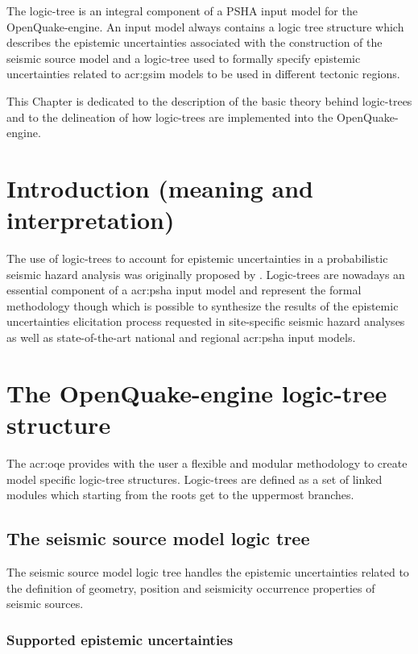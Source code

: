 %
The logic-tree is an integral component of a PSHA input model for the 
OpenQuake-engine. An input model always contains a logic tree structure 
which describes the epistemic uncertainties associated with the construction 
of the seismic source model and a logic-tree used to formally specify 
epistemic uncertainties related to \gls{acr:gsim} models to be used in 
different tectonic regions.

This Chapter is dedicated to the description of the basic theory behind 
logic-trees and to the delineation of how logic-trees are implemented 
into the OpenQuake-engine.
%
\section{Introduction (meaning and interpretation)}
The use of logic-trees to account for epistemic uncertainties in a 
probabilistic seismic hazard analysis was originally proposed by 
\textcite{kulkarni84}.
%
Logic-trees are nowadays an essential component of a \gls{acr:psha} input
model and represent the formal methodology though which is possible to 
synthesize the results of the epistemic uncertainties elicitation process
requested in site-specific seismic hazard analyses \parencite{budnitz1997}
as well as state\--of\--the\--art national and regional \gls{acr:psha} 
input models. 
%
\section{The OpenQuake-engine logic-tree structure}
%
The \gls{acr:oqe} provides with the user a flexible and modular methodology 
to create model specific logic-tree structures. Logic-trees are defined as a
set of linked modules which starting from the roots get to the uppermost 
branches.
%
\subsection{The seismic source model logic tree}
The seismic source model logic tree handles the epistemic uncertainties
related to the definition of geometry, position and seismicity occurrence 
properties of seismic sources. 
%
\subsubsection{Supported epistemic uncertainties}

